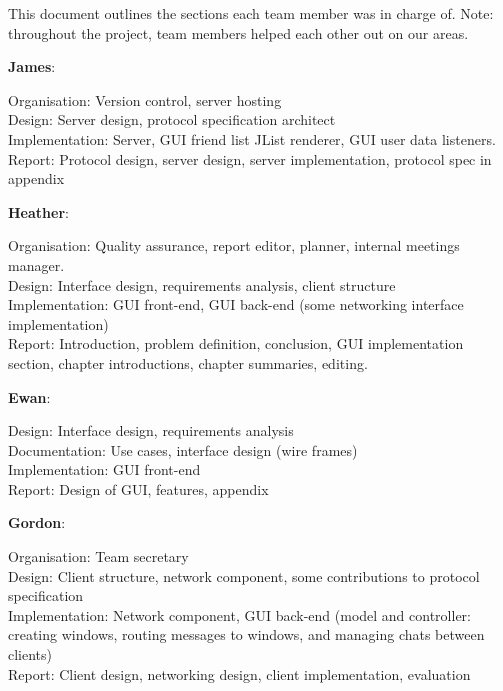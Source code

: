 \label{sumlog}

This document outlines the sections each team member was in charge of. Note: throughout the project, team members helped each other out on our areas.

{\bf James}:

Organisation: Version control, server hosting\\
Design: Server design, protocol specification architect\\
Implementation: Server, GUI friend list JList renderer, GUI user data listeners.\\
Report: Protocol design, server design, server implementation, protocol spec in appendix

{\bf Heather}:

Organisation: Quality assurance, report editor, planner, internal meetings manager.\\
Design: Interface design, requirements analysis, client structure\\
Implementation: GUI front-end, GUI back-end (some networking interface implementation)\\
Report: Introduction, problem definition, conclusion, GUI implementation section, chapter introductions, chapter summaries, editing. 

{\bf Ewan}:

Design: Interface design, requirements analysis\\
Documentation: Use cases, interface design (wire frames)\\
Implementation: GUI front-end\\
Report: Design of GUI, features, appendix

{\bf Gordon}:

Organisation: Team secretary\\
Design: Client structure, network component, some contributions to protocol specification\\
Implementation: Network component, GUI back-end (model and controller: creating windows, routing messages to windows, and managing chats between clients)\\
Report: Client design, networking design, client implementation, evaluation
